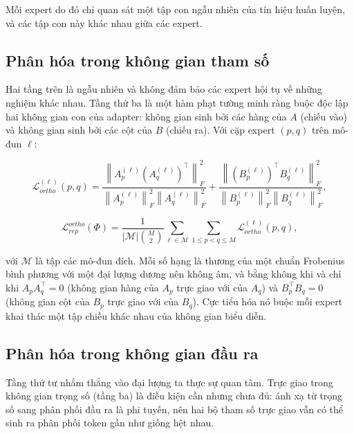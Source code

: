 \documentclass[12pt,a4paper]{article}
\begin{document}
Mỗi expert do đó chỉ quan sát một tập con ngẫu nhiên của tín hiệu huấn luyện, và các tập con này khác nhau giữa các expert.

\subsection{Phân hóa trong không gian tham số}
\label{sec:rep}

Hai tầng trên là ngẫu nhiên và không đảm bảo các expert hội tụ về những nghiệm khác nhau. Tầng thứ ba là một hàm phạt tường minh ràng buộc độc lập hai không gian con của adapter: không gian sinh bởi các hàng của $A$ (chiếu vào) và không gian sinh bởi các cột của $B$ (chiếu ra). Với cặp expert $(p,q)$ trên mô-đun $\ell$:

\begin{equation}
\label{eq:dualortho}
\mathcal{L}_{ortho}^{(\ell)}(p,q)
=
\frac{\left\|A_p^{(\ell)} \left(A_q^{(\ell)}\right)^{\top}\right\|_F^2}
     {\left\|A_p^{(\ell)}\right\|_F^2 \left\|A_q^{(\ell)}\right\|_F^2}
+
\frac{\left\|\left(B_p^{(\ell)}\right)^{\top} B_q^{(\ell)}\right\|_F^2}
     {\left\|B_p^{(\ell)}\right\|_F^2 \left\|B_q^{(\ell)}\right\|_F^2},
\end{equation}

\begin{equation}
\label{eq:reportho}
\mathcal{L}_{rep}^{ortho}(\Phi)
=
\frac{1}{|\mathcal{M}|\binom{M}{2}}
\sum_{\ell \in \mathcal{M}}
\sum_{1 \le p < q \le M}
\mathcal{L}_{ortho}^{(\ell)}(p,q),
\end{equation}

với $\mathcal{M}$ là tập các mô-đun đích. Mỗi số hạng là thương của một chuẩn Frobenius bình phương với một đại lượng dương nên không âm, và bằng không khi và chỉ khi $A_p A_q^{\top} = 0$ (không gian hàng của $A_p$ trực giao với của $A_q$) và $B_p^{\top} B_q = 0$ (không gian cột của $B_p$ trực giao với của $B_q$). Cực tiểu hóa nó buộc mỗi expert khai thác một tập chiều khác nhau của không gian biểu diễn.

\subsection{Phân hóa trong không gian đầu ra}
\label{sec:jsloss}

Tầng thứ tư nhắm thẳng vào đại lượng ta thực sự quan tâm. Trực giao trong không gian trọng số (tầng ba) là điều kiện cần nhưng chưa đủ: ánh xạ từ trọng số sang phân phối đầu ra là phi tuyến, nên hai bộ tham số trực giao vẫn có thể sinh ra phân phối token gần như giống hệt nhau.
\end{document}
